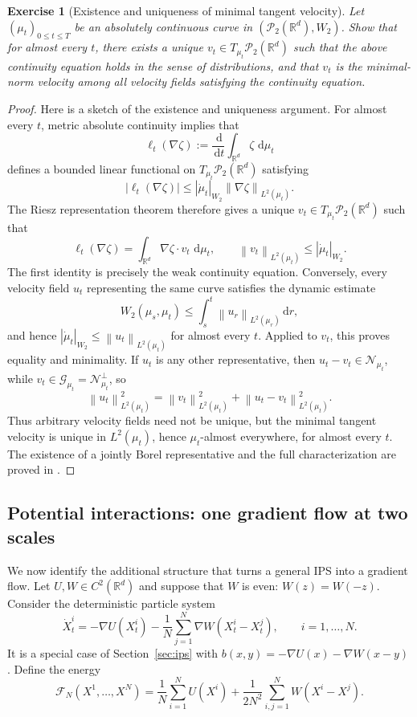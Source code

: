 \documentclass[11pt]{amsart}
\numberwithin{equation}{section}
\theoremstyle{plain}
\newtheorem{exercise}[theorem]{Exercise}
\newcommand{\R}{\mathbb{R}}
\newcommand{\cP}{\mathcal{P}}
\newcommand{\dd}{\,\mathrm{d}}
\newcommand{\abs}[1]{\left\lvert#1\right\rvert}
\newcommand{\norm}[1]{\left\lVert#1\right\rVert}
\begin{document}
\begin{exercise}[Existence and uniqueness of minimal tangent velocity]\label{exe:vt_existence}
Let $(\mu_t)_{0\leq t\leq T}$ be an absolutely continuous curve in $(\cP_2(\R^d),W_2)$. Show that for almost every $t$, there exists a unique $v_t\in T_{\mu_t}\cP_2(\R^d)$ such that the above continuity equation holds in the sense of distributions, and that $v_t$ is the minimal-norm velocity
  among all velocity fields satisfying the continuity equation.
\end{exercise}
\begin{proof}
Here is a sketch of the existence and uniqueness argument.  For almost every $t$, metric
absolute continuity implies that
\[
 \ell_t(\nabla\zeta)
 :=\frac{\dd}{\dd t}\int_{\R^d}\zeta\,\dd\mu_t
\]
defines a bounded linear functional on $T_{\mu_t}\cP_2(\R^d)$ satisfying
\[
 \abs{\ell_t(\nabla\zeta)}
 \leq \abs{\dot\mu_t}_{W_2}
       \norm{\nabla\zeta}_{L^2(\mu_t)}.
\]
The Riesz representation theorem therefore gives a unique
$v_t\in T_{\mu_t}\cP_2(\R^d)$ such that
\[
 \ell_t(\nabla\zeta)
 =\int_{\R^d}\nabla\zeta\cdot v_t\,\dd\mu_t,
 \qquad
 \norm{v_t}_{L^2(\mu_t)}
 \leq\abs{\dot\mu_t}_{W_2}.
\]
The first identity is precisely the weak continuity equation.  Conversely,
every velocity field $u_t$ representing the same curve satisfies the dynamic
estimate
\[
 W_2(\mu_s,\mu_t)
 \leq\int_s^t\norm{u_r}_{L^2(\mu_r)}\dd r,
\]
and hence
$\abs{\dot\mu_t}_{W_2}\leq\norm{u_t}_{L^2(\mu_t)}$ for almost every $t$.
Applied to $v_t$, this proves equality and minimality.  If $u_t$ is any other
representative, then $u_t-v_t\in\mathcal N_{\mu_t}$, while
$v_t\in\mathcal G_{\mu_t}=\mathcal N_{\mu_t}^\perp$, so
\[
 \norm{u_t}_{L^2(\mu_t)}^2
 =\norm{v_t}_{L^2(\mu_t)}^2
  +\norm{u_t-v_t}_{L^2(\mu_t)}^2.
\]
Thus arbitrary velocity fields need not be unique, but the minimal tangent
velocity is unique in $L^2(\mu_t)$, hence $\mu_t$-almost everywhere, for
almost every $t$.  The existence of a jointly Borel representative and the
full characterization are proved in
\cite[Theorem~8.3.1 and Proposition~8.4.5]
{AmbrosioGigliSavare2008}.
\end{proof}

\subsection{Potential interactions: one gradient flow at two scales}\label{sec:potential-interactions}

We now identify the additional structure that turns a general IPS into
a gradient flow.  Let $U,W\in C^2(\R^d)$ and suppose that $W$ is even:
$W(z)=W(-z)$.  Consider the deterministic particle system
\begin{equation}\label{eq:potential-particle-system}
 \dot X_t^i=-\nabla U(X_t^i)
 -\frac1N\sum_{j=1}^N\nabla W(X_t^i-X_t^j),
 \qquad i=1,\ldots,N.
\end{equation}
It is a special case of Section~\ref{sec:ips} with
$b(x,y)=-\nabla U(x)-\nabla W(x-y)$.  Define the energy
\begin{equation}\label{eq:finite-particle-energy}
 \mathcal F_N(X^1,\ldots,X^N)
 =\frac1N\sum_{i=1}^NU(X^i)
 +\frac1{2N^2}\sum_{i,j=1}^NW(X^i-X^j).
\end{equation}
\end{document}
